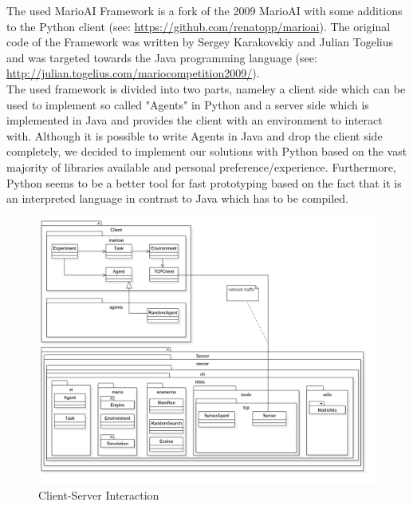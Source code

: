 \documentclass[]{article}
\begin{document}
The used MarioAI Framework is a fork of the 2009 MarioAI with some additions to the Python client (see: \url{https://github.com/renatopp/marioai}). The original code of the Framework was written by Sergey Karakovskiy and Julian Togelius and was targeted towards the Java programming language (see: \url{http://julian.togelius.com/mariocompetition2009/}).\\
The used framework is divided into two parts, nameley a client side which can be used to implement so called "Agents" in Python and a server side which is implemented in Java and provides the client with an environment to interact with. Although it is possible to write Agents in Java and drop the client side completely, we decided to implement our solutions with Python based on the vast majority of libraries available and personal preference/experience. Furthermore, Python seems to be a better tool for fast prototyping based on the fact that it is an interpreted language in contrast to Java which has to be compiled.\\


\begin{figure}[h]
    \centering
    \includegraphics[width=0.9\linewidth]{images/client_server_interaction.png}
    \caption{Client-Server Interaction}
    \label{fig:client_server_interaction}
\end{figure}
\end{document}
